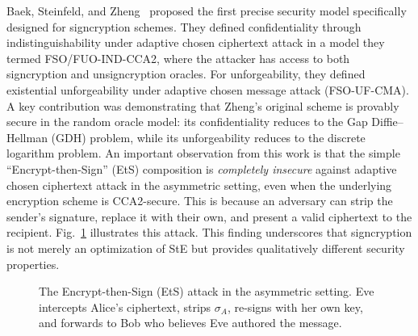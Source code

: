 \documentclass[conference]{IEEEtran}
\begin{document}
Baek, Steinfeld, and Zheng~\cite{baek2002} proposed the first precise security model specifically designed for signcryption schemes. They defined confidentiality through indistinguishability under adaptive chosen ciphertext attack in a model they termed FSO/FUO-IND-CCA2, where the attacker has access to both signcryption and unsigncryption oracles. For unforgeability, they defined existential unforgeability under adaptive chosen message attack (FSO-UF-CMA). A key contribution was demonstrating that Zheng's original scheme is provably secure in the random oracle model: its confidentiality reduces to the Gap Diffie--Hellman (GDH) problem, while its unforgeability reduces to the discrete logarithm problem. An important observation from this work is that the simple ``Encrypt-then-Sign'' (EtS) composition is \textit{completely insecure} against adaptive chosen ciphertext attack in the asymmetric setting, even when the underlying encryption scheme is CCA2-secure. This is because an adversary can strip the sender's signature, replace it with their own, and present a valid ciphertext to the recipient. Fig.~\ref{fig:ets_attack} illustrates this attack. This finding underscores that signcryption is not merely an optimization of StE but provides qualitatively different security properties.

\begin{figure}[t]
\centering
{}
\caption{The Encrypt-then-Sign (EtS) attack in the asymmetric setting. Eve intercepts Alice's ciphertext, strips $\sigma_A$, re-signs with her own key, and forwards to Bob who believes Eve authored the message.}
\label{fig:ets_attack}
\end{figure}
\end{document}
